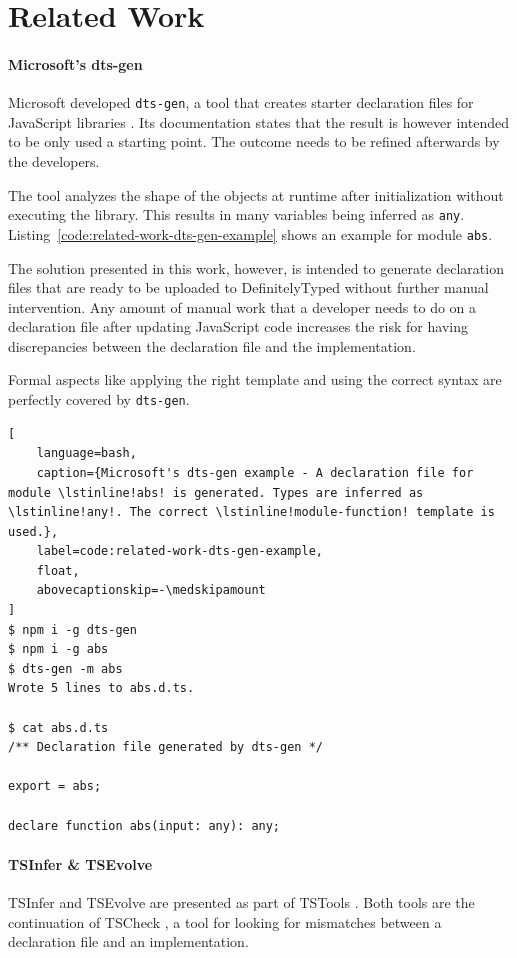 \documentclass[a4paper,english,cleveref, autoref]{lipics-v2019}
\newcommand{\coderef}[1]{Listing~\ref{#1}}
\begin{document}
\section{Related Work}
\label{sec:related-work}
\paragraph*{Microsoft's dts-gen}
Microsoft developed \texttt{dts-gen}, a tool that creates starter declaration files for JavaScript libraries \cite{dts-gen}. Its documentation states that the result is however intended to be only used a starting point. The outcome needs to be refined afterwards by the developers.

The tool analyzes the shape of the objects at runtime after initialization without executing the library. This results in many variables being inferred as \lstinline[language={}]{any}. \coderef{code:related-work-dts-gen-example} shows an example for module \lstinline[language={}]{abs}.

The solution presented in this work, however, is intended to generate declaration files that are ready to be uploaded to DefinitelyTyped without further manual intervention. Any amount of manual work that a developer needs to do on a declaration file after updating JavaScript code increases the risk for having discrepancies between the declaration file and the implementation.

Formal aspects like applying the right template and using the correct syntax are perfectly covered by \texttt{dts-gen}.

\begin{lstlisting}[
    language=bash,
    caption={Microsoft's dts-gen example - A declaration file for module \lstinline!abs! is generated. Types are inferred as \lstinline!any!. The correct \lstinline!module-function! template is used.},
	label=code:related-work-dts-gen-example,
    float,
    abovecaptionskip=-\medskipamount
]
$ npm i -g dts-gen
$ npm i -g abs
$ dts-gen -m abs
Wrote 5 lines to abs.d.ts.

$ cat abs.d.ts
/** Declaration file generated by dts-gen */

export = abs;

declare function abs(input: any): any;
\end{lstlisting}

\paragraph*{TSInfer \& TSEvolve}
TSInfer and TSEvolve are presented as part of TSTools \cite{DBLP:conf/fase/KristensenM17}. Both tools are the continuation of TSCheck \cite{DBLP:conf/oopsla/FeldthausM14}, a tool for looking for mismatches between a declaration file and an implementation.
\end{document}
